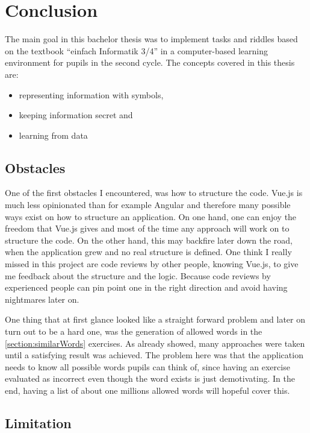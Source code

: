 \chapter{Conclusion}
\label{chapter:conclusion}

The main goal in this bachelor thesis was to implement tasks and riddles based on the textbook “einfach Informatik 3/4” in a computer-based learning environment for pupils in the second cycle. The concepts covered in this thesis are:

\begin{itemize}
    \item representing information with symbols,
    \item keeping information secret and
    \item learning from data
\end{itemize}

\section{Obstacles}
\label{section:obstacles}

One of the first obstacles I encountered, was how to structure the code. Vue.js is much less opinionated than for example Angular and therefore many possible ways exist on how to structure an application. On one hand, one can enjoy the freedom that Vue.js gives and most of the time any approach will work on to structure the code. On the other hand, this may backfire later down the road, when the application grew and no real structure is defined. One think I really missed in this project are code reviews by other people, knowing Vue.js, to give me feedback about the structure and the logic. Because code reviews by experienced people can pin point one in the right direction and avoid having nightmares later on.

One thing that at first glance looked like a straight forward problem and later on turn out to be a hard one, was the generation of allowed words in the \ref{section:similarWords} exercises. As already showed, many approaches were taken until a satisfying result was achieved. The problem here was that the application needs to know all possible words pupils can think of, since having an exercise evaluated as incorrect even though the word exists is just demotivating. In the end, having a list of about one millions allowed words will hopeful cover this.

\section{Limitation}
\label{section:limitation}

